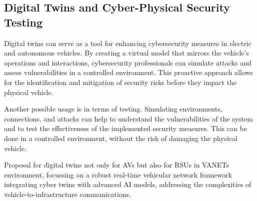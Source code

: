 \subsection{Digital Twins and Cyber-Physical Security Testing}\label{subsec:digital-twins-and-cyber-physical-security-testing}
Digital twins can serve as a tool for enhancing cybersecurity measures in electric and autonomous vehicles.
By creating a virtual model that mirrors the vehicle's operations and interactions,
cybersecurity professionals can simulate attacks and assess vulnerabilities in a controlled environment.
This proactive approach allows for the identification and mitigation of security risks
before they impact the physical vehicle\cite{ali2023review}.

Another possible usage is in terms of testing.
Simulating environments, connections,
and attacks can help to understand the vulnerabilities of the system
and to test the effectiveness of the implemented security measures.
This can be done in a controlled environment, without the risk of damaging the physical vehicle.\cite{yigit2024cyber}

Proposal for digital twins not only for AVs but also for RSUs in VANETs environment,
focussing on a robust real-time vehicular network framework integrating cyber twins with advanced AI models,
addressing the complexities of vehicle-to-infrastructure communications\cite{yigit2024cyber}.